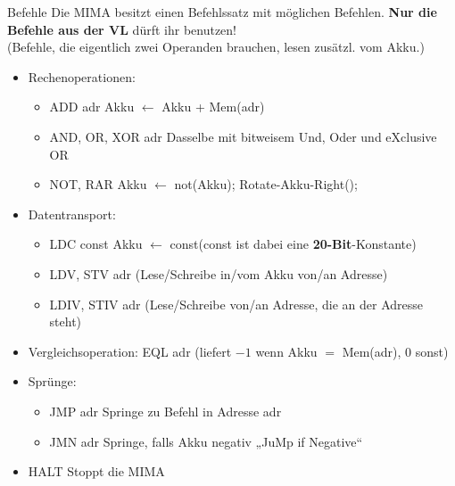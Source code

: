 \newcommand{\itemizeconfig}{\setlength{\parsep}{0pt}\setlength{\parskip}{0pt}\setlength{\topsep}{0pt}\setlength{\partopsep}{0pt}}
\newcommand{\explain}[1]{\hfill {\small #1 }}
\begin{frame}{Befehle}
	Die MIMA besitzt einen Befehlssatz mit möglichen Befehlen. %
	\textbf{Nur die Befehle aus der VL} dürft ihr benutzen! \\ 
	\smallskip
	(Befehle, die eigentlich zwei Operanden brauchen, lesen zusätzl. vom Akku.)
	{
	\begin{itemize}[<+->] \itemizeconfig
		\item Rechenoperationen:
		\begin{itemize} 
			\item ADD adr \explain{Akku $\leftarrow$ Akku + Mem(adr)}
			\item AND, OR, XOR adr \explain{Dasselbe mit bitweisem Und, Oder und eXclusive OR}
			\item NOT, RAR \explain{Akku $\leftarrow$ not(Akku); \quad  Rotate-Akku-Right();}
		\end{itemize}
		\item Datentransport:
		\begin{itemize}
			\item LDC const \explain{Akku $\leftarrow$ const\quad (const ist dabei eine \textbf{20-Bit}-Konstante) }
			\item LDV, STV adr \explain{(Lese/Schreibe in/vom Akku von/an Adresse)}
			\item LDIV, STIV adr \explain{(Lese/Schreibe von/an Adresse, die an der Adresse steht)}
		\end{itemize}
		\item Vergleichsoperation: EQL adr \explain{(liefert $-1$ wenn Akku $=$ Mem(adr), 0 sonst)}
		\item Sprünge:
		\begin{itemize}
			\item JMP adr \explain{Springe zu Befehl in Adresse adr}
			\item JMN adr \explain{Springe, falls Akku negativ \quad „JuMp if Negative“}
		\end{itemize}
		\item HALT \explain{Stoppt die MIMA}
	\end{itemize}}
\end{frame}

